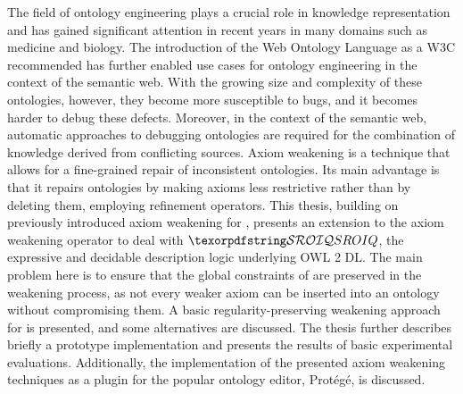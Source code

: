 
The field of ontology engineering plays a crucial role in knowledge representation and has gained significant attention in recent years in many domains such as medicine and biology. The introduction of the Web Ontology Language as a W3C recommended has further enabled use cases for ontology engineering in the context of the semantic web. With the growing size and complexity of these ontologies, however, they become more susceptible to bugs, and it becomes harder to debug these defects. Moreover, in the context of the semantic web, automatic approaches to debugging ontologies are required for the combination of knowledge derived from conflicting sources. Axiom weakening is a technique that allows for a fine-grained repair of inconsistent ontologies. Its main advantage is that it repairs ontologies by making axioms less restrictive rather than by deleting them, employing refinement operators. This thesis, building on previously introduced axiom weakening for \ALC, presents an extension to the axiom weakening operator to deal with $\SROIQ$, the expressive and decidable description logic underlying OWL 2 DL. The main problem here is to ensure that the global constraints of \SROIQ are preserved in the weakening process, as not every weaker axiom can be inserted into an ontology without compromising them. A basic regularity-preserving weakening approach for \SROIQ is presented, and some alternatives are discussed. The thesis further describes briefly a prototype implementation and presents the results of basic experimental evaluations. Additionally, the implementation of the presented axiom weakening techniques as a plugin for the popular ontology editor, Protégé, is discussed.
